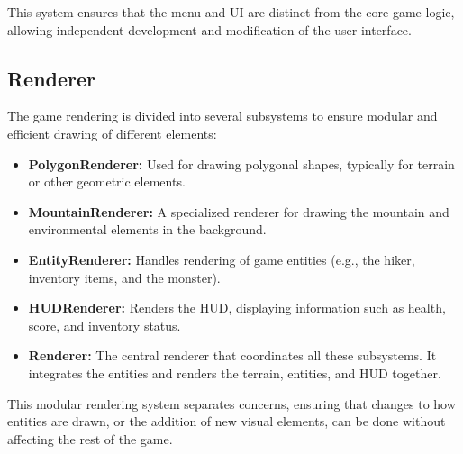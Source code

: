 This system ensures that the menu and UI are distinct from the core game logic, allowing independent development and modification of the user interface.

\subsection{Renderer}

The game rendering is divided into several subsystems to ensure modular and efficient drawing of different elements:

\begin{itemize}
    \item \textbf{PolygonRenderer:} Used for drawing polygonal shapes, typically for terrain or other geometric elements.
    \item \textbf{MountainRenderer:} A specialized renderer for drawing the mountain and environmental elements in the background.
    \item \textbf{EntityRenderer:} Handles rendering of game entities (e.g., the hiker, inventory items, and the monster).
    \item \textbf{HUDRenderer:} Renders the HUD, displaying information such as health, score, and inventory status.
    \item \textbf{Renderer:} The central renderer that coordinates all these subsystems. It integrates the  entities and renders the terrain, entities, and HUD together.
\end{itemize}

This modular rendering system separates concerns, ensuring that changes to how entities are drawn, or the addition of new visual elements, can be done without affecting the rest of the game.